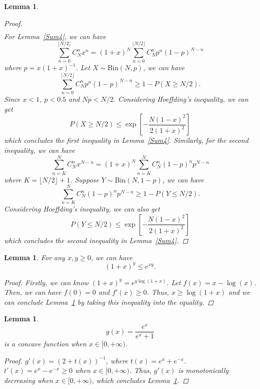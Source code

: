 \documentclass{article}
\newtheorem{lemma}[theorem]{Lemma}
\begin{document}
\begin{lemma}
\begin{proof}
\begin{equation}
\begin{split}
\end{split}
\end{equation}
For Lemma~\ref{Sum4}, we can have
\begin{equation}
\sum_{n=0}^{\lfloor N/2\rfloor} C_N^{n} x^{n}=(1+x)^{N}\sum_{n=0}^{\lfloor N/2\rfloor} C_N^{n} p^n (1-p)^{N-n}
\end{equation}
where $p=x(1+x)^{-1}$. Let $X\sim \mathrm{Bin}(N, p)$, we can have
\begin{equation}
\sum_{n=0}^{\lfloor N/2\rfloor} C_N^{n} p^n (1-p)^{N-n}\geq 1-P\left(X\geq N/2\right).
\end{equation}
Since $x<1$, $p<0.5$ and $Np<N/2$. Considering Hoeffding's inequality, we can get
\begin{equation}
P\left(X\geq N/2\right)\leq \exp \left[-\frac{N(1-x)^2}{2(1+x)^2}\right]
\end{equation}
which concludes the first inequality in Lemma~\ref{Sum4}. Similarly, for the second inequality, we can have
\begin{equation}
\sum_{n=K}^{N} C_N^{n}x^{N-n}=(1+x)^{N}\sum_{n=K}^{N} C_N^{n} (1-p)^n p^{N-n}
\end{equation}
where $K=\lfloor N/2 \rfloor +1$. Suppose $Y\sim \mathrm{Bin}(N, 1-p)$, we can have
\begin{equation}
\sum_{n=K}^{N} C_N^{n} (1-p)^n p^{N-n}\geq 1-P\left(Y\leq N/2\right).
\end{equation}
Considering Hoeffding's inequality, we can also get
\begin{equation}
P\left(Y\leq N/2\right)\leq \exp \left[-\frac{N(1-x)^2}{2(1+x)^2}\right]
\end{equation}
which concludes the second inequality in Lemma~\ref{Sum4}.
\end{proof}
\end{lemma}

\begin{lemma}
\label{Inequality1}
For any $x,y\geq 0$, we can have
$$(1+x)^{y}\leq e^{xy}.$$
\begin{proof}
Firstly, we can know $(1+x)^{y}=e^{y\log(1+x)}$. Let $f(x)=x-\log(x)$. Then, we can have $f(0)=0$ and $f'(x)\geq 0$. Thus, $x\geq\log (1+x)$ and we can conclude Lemma~\ref{Inequality1} by taking this inequality into the equality.
\end{proof}
\end{lemma}

\begin{lemma}
\label{Concave1}
$$g(x)=\frac{e^x}{e^x+1}$$
is a concave function when $x\in [0,+\infty)$.
\begin{proof}
$g'(x)= (2+t(x))^{-1}$, where $t(x)=e^x+e^{-x}$. $t'(x)=e^x-e^{-x}\geq 0$ when $x\in [0,+\infty)$. Thus, $g'(x)$ is monotonically decreasing when $x\in [0,+\infty)$, which concludes Lemma~\ref{Concave1}.
\end{proof}
\end{lemma}
\end{document}
